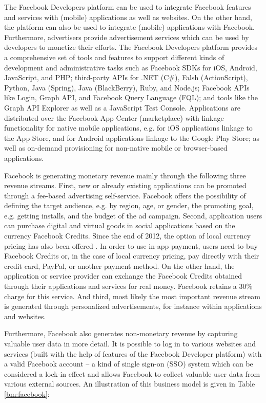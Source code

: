 The Facebook Developers platform can be used to integrate Facebook features and services with (mobile) applications as well as websites. On the other hand, the platform can also be used to integrate (mobile) applications with Facebook. Furthermore, advertisers provide advertisement services which can be used by developers to monetize their efforts. The Facebook Developers platform provides a comprehensive set of tools and features to support different kinds of development and administrative tasks \citep{Facebook2013a} such as Facebook \acp{SDK} for iOS, Android, JavaScript, and PHP; third-party \acp{API} for .NET (C\#), Falsh (ActionScript), Python, Java (Spring), Java (BlackBerry), Ruby, and Node.js; Facebook \acp{API} like Login, Graph \ac{API}, and Facebook Query Language (FQL); and tools like the Graph \ac{API} Explorer as well as a JavaScript Test Console. Applications are distributed over the Facebook App Center (marketplace) with linkage functionality for native mobile applications, e.g. for iOS applications linkage to the App Store, and for Android applications linkage to the Google Play Store; as well as on-demand provisioning for non-native mobile or browser-based applications.

Facebook is generating monetary revenue mainly through the following three revenue streams. First, new or already existing applications can be promoted through a fee-based advertising self-service. Facebook offers the possibility of defining the target audience, e.g. by region, age, or gender, the promoting goal, e.g. getting installs, and the budget of the ad campaign. Second, application users can purchase digital and virtual goods in social applications based on the currency Facebook Credits. Since the end of 2012, the option of local currency pricing has also been offered \citep{Facebook2013a}. In order to use in-app payment, users need to buy Facebook Credits or, in the case of local currency pricing, pay directly with their credit card, PayPal, or another payment method. On the other hand, the application or service provider can exchange the Facebook Credits obtained through their applications and services for real money. Facebook retains a 30\% charge for this service. And third, most likely the most important revenue stream is generated through personalized advertisements, for instance within applications and websites.

Furthermore, Facebook also generates non-monetary revenue by capturing valuable user data in more detail. It is possible to log in to various websites and services (built with the help of features of the Facebook Developer platform) with a valid Facebook account -- a kind of single sign-on (SSO) system which can be considered a lock-in effect and allows Facebook to collect valuable user data from various external sources. An illustration of this business model is given in Table \ref{bm:facebook}:

